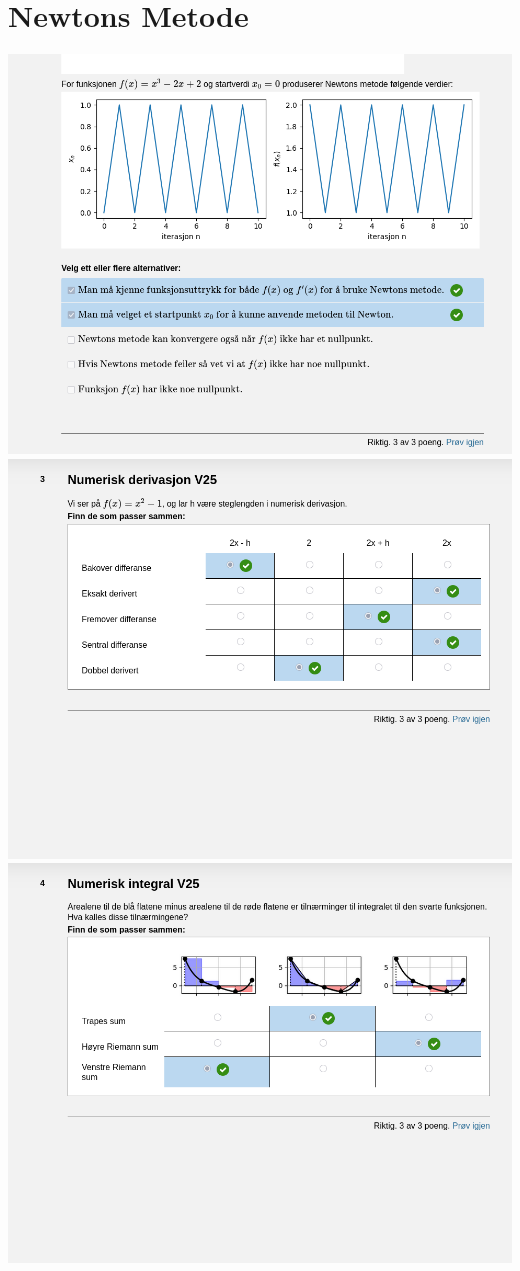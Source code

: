 \documentclass[12pt]{article}
\begin{document}
\section*{Newtons Metode}
\includegraphics[width=\textwidth]{Screenshot_20250521_134348.png}
\newpage
\includegraphics[width=\textwidth]{Screenshot_20250521_134437.png}
\includegraphics[width=\textwidth]{Screenshot_20250521_134522.png}
\end{document}
